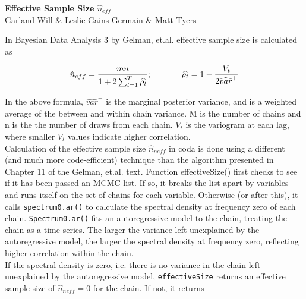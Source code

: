 \documentclass[12pt]{article}\usepackage[]{graphicx}\usepackage[]{color}
\begin{document}
\begin{center}
{\bf Effective Sample Size $\hat{n}_{eff}$}\\
Garland Will \& Leslie Gains-Germain \& Matt Tyers\\
\end{center}

\noindent In Bayesian Data Analysis 3 by Gelman, et.al. effective sample size is calculated as

$$\hat{n}_{eff} = \frac{mn}{1 + 2 \sum_{t=1}^{T}\widehat{\rho_t}}; \hspace{.5 in} \widehat{\rho_t} = 1- \frac{V_t}{2 \widehat{var}^+}$$

\noindent In the above formula, $\widehat{var}^+$ is the marginal posterior variance, and is a weighted average of the between and within chain variance. M is the number of chains and n is the the number of draws from each chain.  $V_t$ is the variogram at each lag, where smaller $V_t$ values indicate higher correlation. \\  


\noindent Calculation of the effective sample size $\hat{n}_{neff}$ in coda is done using a different (and much more code-efficient) technique than the algorithm presented in Chapter 11 of the Gelman, et.al. text. Function effectiveSize() first checks to see if it has been passed an MCMC list. If so, it breaks the list apart by variables and runs itself on the set of chains for each variable. Otherwise (or after this), it calls \verb+spectrum0.ar()+ to calculate the spectral density at frequency zero of each chain.  \verb+Spectrum0.ar()+ fits an autoregressive model to the chain, treating the chain as a time series. %
The larger the variance left unexplained by the autoregressive model, the larger the spectral density at frequency zero, reflecting higher correlation within the chain. \\





\noindent If the spectral density is zero, i.e. there is no variance in the chain left unexplained by the autoregressive model, \verb+effectiveSize+ returns an effective sample size of $\hat{n}_{neff} = 0$ for the chain. If not, it returns
\end{document}
